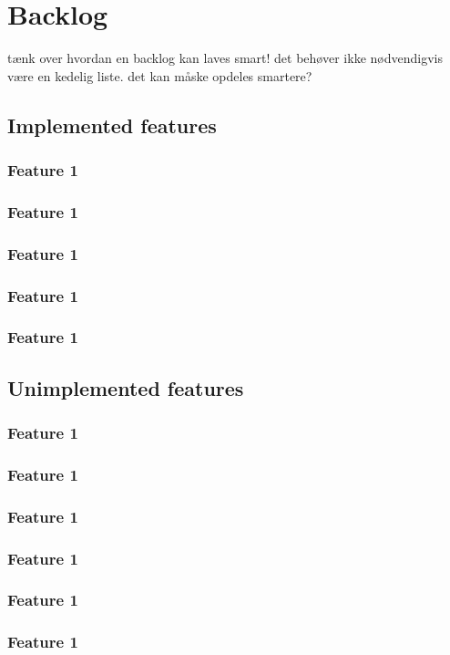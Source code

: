 \chapter{Backlog}
\label{chap:backlog}

t\ae{}nk over hvordan en backlog kan laves smart! det beh\o{}ver ikke nødvendigvis være en kedelig liste. det kan m\aa{}ske opdeles smartere?


\section{Implemented features}
\subsection{Feature 1}
\subsection{Feature 1}
\subsection{Feature 1}
\subsection{Feature 1}
\subsection{Feature 1}
\section{Unimplemented features}
\subsection{Feature 1}
\subsection{Feature 1}
\subsection{Feature 1}
\subsection{Feature 1}
\subsection{Feature 1}
\subsection{Feature 1}